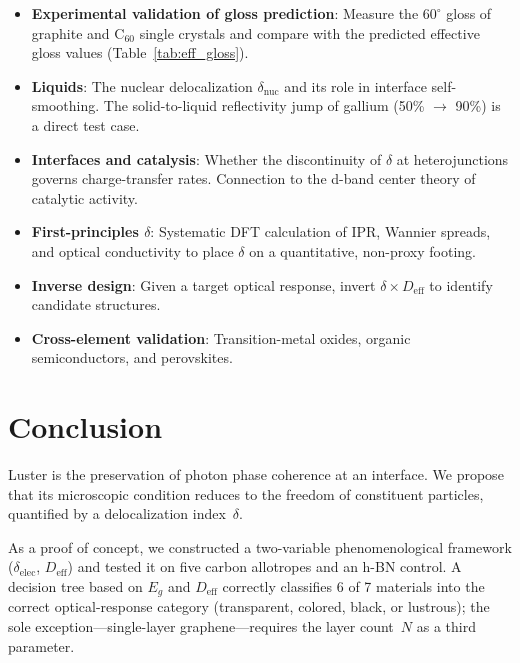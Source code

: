 \documentclass[twocolumn,showpacs,preprintnumbers,amsmath,amssymb,prb]{revtex4-2}
\begin{document}
\begin{itemize}
  \item \textbf{Experimental validation of gloss prediction}: Measure
    the $60^\circ$ gloss of graphite and C$_{60}$ single crystals
    and compare with the predicted effective gloss values
    (Table~\ref{tab:eff_gloss}).
  \item \textbf{Liquids}: The nuclear delocalization
    $\delta_\mathrm{nuc}$ and its role in interface self-smoothing.
    The solid-to-liquid reflectivity jump of gallium (50\% $\to$ 90\%)
    is a direct test case.
  \item \textbf{Interfaces and catalysis}: Whether the discontinuity
    of $\delta$ at heterojunctions governs charge-transfer rates.
    Connection to the d-band center theory of catalytic activity.
  \item \textbf{First-principles $\delta$}: Systematic DFT calculation
    of IPR, Wannier spreads, and optical conductivity to place $\delta$
    on a quantitative, non-proxy footing.
  \item \textbf{Inverse design}: Given a target optical response,
    invert $\delta \times D_\mathrm{eff}$ to identify candidate
    structures.
  \item \textbf{Cross-element validation}: Transition-metal oxides,
    organic semiconductors, and perovskites.
\end{itemize}

\section{Conclusion}
\label{sec:conclusion}

Luster is the preservation of photon phase coherence at an interface.
We propose that its microscopic condition reduces to the freedom of
constituent particles, quantified by a delocalization index~$\delta$.

As a proof of concept, we constructed a two-variable phenomenological
framework ($\delta_\mathrm{elec}$, $D_\mathrm{eff}$) and tested it on
five carbon allotropes and an h-BN control. A decision tree based on
$E_g$ and $D_\mathrm{eff}$ correctly classifies 6 of 7 materials
into the correct optical-response category (transparent, colored,
black, or lustrous); the sole exception---single-layer graphene---requires
the layer count~$N$ as a third parameter.
\end{document}
